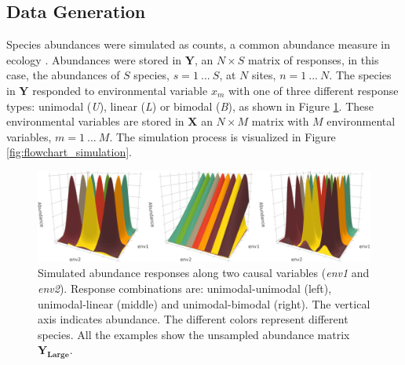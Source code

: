 \documentclass[a4paper,11pt]{article}
\begin{document}
	\subsection{Data Generation}
		Species abundances were simulated as counts, a common abundance measure in ecology \citep{Warton2008}. 
		Abundances were stored in $\mathbf{Y}$, an $N \times S$ matrix of responses, in this case, the abundances of $S$ species, $ s= 1\ ...\ S$, at $N$ sites, $ n = 1\ ...\ N$.
		The species in $\mathbf{Y}$ responded to  environmental variable $x_m$ with one of three different response types: unimodal (\textit{U}), linear (\textit{L}) or bimodal (\textit{B}), as shown in Figure \ref{fig:bivariateExample}.
		These environmental variables are stored in $\mathbf{X}$ an $N \times M$ matrix with $M$ environmental variables, $m = 1\ ... \ M$. 
	    The simulation process is visualized in Figure \ref{fig:flowchart_simulation}. 
	    
	    
		\begin{figure}[ht]
			
			\begin{center}
			    
			    \includegraphics[width = 1\linewidth]{Communities_trimmed_appended}     
			   	\caption{
			                Simulated abundance responses along two causal variables (\textit{env1} and \textit{env2}). 
                            Response combinations are: unimodal-unimodal (left), unimodal-linear (middle) and unimodal-bimodal (right). 
                			The vertical axis indicates abundance. 
                			The different colors represent different species.
                			All the examples show the unsampled abundance matrix
                			$\mathbf{Y_{Large}}$.
			            }
			\label{fig:bivariateExample} 
			\end{center}
			

		\end{figure}
        
\end{document}
